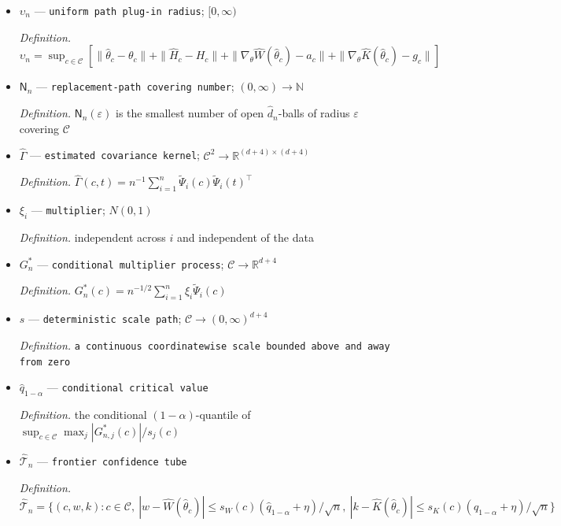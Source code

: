 \documentclass{article}
\begin{document}
\begin{itemize}
  \item \(\upsilon_n\) --- \texttt{uniform path plug-\allowbreak{}in radius}; \([0,\infty)\)
  \par\smallskip\noindent\emph{Definition.} \(\upsilon_n=\sup_{c\in\mathcal C}[\|\widehat\theta_c-\theta_c\|+\|\widehat H_c-H_c\|+\|\nabla_\theta\widehat W(\widehat\theta_c)-a_c\|+\|\nabla_\theta\widehat K(\widehat\theta_c)-g_c\|]\)
  \item \(\mathsf N_n\) --- \texttt{replacement-\allowbreak{}path covering number}; \((0,\infty)\to\mathbb N\)
  \par\smallskip\noindent\emph{Definition.} \(\mathsf N_n(\varepsilon)\) is the smallest number of open \(\widehat d_n\)-balls of radius \(\varepsilon\) covering \(\mathcal C\)
  \item \(\widehat\Gamma\) --- \texttt{estimated covariance kernel}; \(\mathcal C^2\to\mathbb R^{(d+4)\times(d+4)}\)
  \par\smallskip\noindent\emph{Definition.} \(\widehat\Gamma(c,t)=n^{-1}\sum_{i=1}^n\widetilde\Psi_i(c)\widetilde\Psi_i(t)^\top\)
  \item \(\xi_i\) --- \texttt{multiplier}; \(N(0,1)\)
  \par\smallskip\noindent\emph{Definition.} independent across \(i\) and independent of the data
  \item \(G_n^*\) --- \texttt{conditional multiplier process}; \(\mathcal C\to\mathbb R^{d+4}\)
  \par\smallskip\noindent\emph{Definition.} \(G_n^*(c)=n^{-1/2}\sum_{i=1}^n\xi_i\widetilde\Psi_i(c)\)
  \item \(s\) --- \texttt{deterministic scale path}; \(\mathcal C\to(0,\infty)^{d+4}\)
  \par\smallskip\noindent\emph{Definition.} \texttt{a continuous coordinatewise scale bounded above and away from zero}
  \item \(\widehat q_{1-\alpha}\) --- \texttt{conditional critical value}
  \par\smallskip\noindent\emph{Definition.} the conditional \((1-\alpha)\)-quantile of \(\sup_{c\in\mathcal C}\max_j|G^*_{n,j}(c)|/s_j(c)\)
  \item \(\widehat{\mathcal T}_n\) --- \texttt{frontier confidence tube}
  \par\smallskip\noindent\emph{Definition.} \(\widehat{\mathcal T}_n=\{(c,w,k):c\in\mathcal C,\ |w-\widehat W(\widehat\theta_c)|\le s_W(c)(\widehat q_{1-\alpha}+\eta)/\sqrt n,\ |k-\widehat K(\widehat\theta_c)|\le s_K(c)(\widehat q_{1-\alpha}+\eta)/\sqrt n\}\)

\end{itemize}
\end{document}

